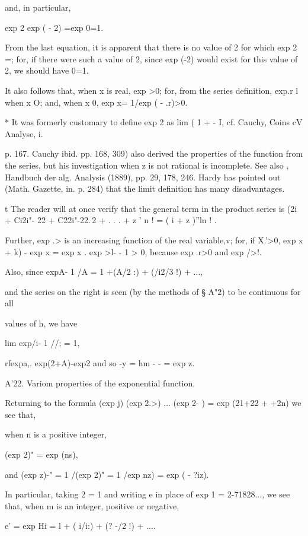 and, in particular,

 exp 2 exp ( - 2) =exp 0=1.

From the last equation, it is apparent that there is no value of 2 for
which exp 2 =; for, if there were such a value of 2, since exp (-2)
would exist for this value of 2, we should have 0=1.

It also follows that, when x is real, exp >0; for, from the series
definition, exp.r l when x O; and, when x 0, exp x= 1/exp ( - .r)>0.

* It was formerly customary to define exp 2 as lim ( 1 + - I, cf.
  Cauchy, Coins cV Analyse, i.

p. 167. Cauchy ibid. pp. 168, 309) also derived the properties of the
function from the series, but his investigation when z is not rational
is incomplete. See also \Schlomilch, Handbuch der alg. Analysis
(1889), pp. 29, 178, 246. Hardy has pointed out (Math. Gazette, in. p.
284) that the limit definition has many disadvantages.

t The reader will at once verify that the general term in the product
series is (2i + Ci2i"- 22 + C22i"-22.\,2 + . . . + z ' n ! = ( i + z
)''ln ! .

%
%

Further, exp .> is an increasing function of the real variable,v;
for, if X.'>0, exp x + k) - exp x = exp x . exp >l- - 1 > 0, because
exp .r>0 and exp />!.

Also, since expA- 1 /A = 1 +(A/2 :) + (/i2/3 !) + ...,

and the series on the right is seen (by the methods of § A"2) to be
continuous for all

values of h, we have

lim exp/i- 1 //; = 1,

rfexpa,. exp(2+A)-exp2 and so -y = hm - - = exp z.

A'22. Variom properties of the exponential function.

Returning to the formula (exp j) (exp 2.>) ... (exp 2- ) = exp (21+22
+ +2n) we see that,

when n is a positive integer,

(exp 2)" = exp (ns),

and (exp z)-" = 1 /(exp 2)" = 1 /exp nz) = exp ( - ?iz).

In particular, taking 2 = 1 and writing e in place of exp 1 =
2-71828..., we see that, when m is an integer, positive or negative,

e' = exp Hi = l + ( i/i:) + (? -/2 !) + ....

